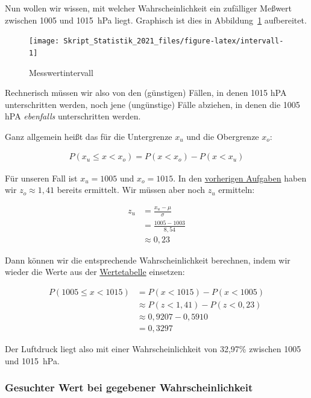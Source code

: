 \documentclass[
  11pt,
  ngerman,
  a4paper,
]{report}
\begin{document}
Nun wollen wir wissen, mit welcher Wahrscheinlichkeit ein zufälliger Meßwert zwischen 1005 und 1015~hPa liegt. Graphisch ist dies in Abbildung~\ref{fig:intervall} aufbereitet.

\begin{figure}[!h]

{\centering \texttt{[image: Skript\_Statistik\_2021\_files/figure-latex/intervall-1]} 

}

\caption{Messwertintervall}\label{fig:intervall}
\end{figure}

Rechnerisch müssen wir also von den (günstigen) Fällen, in denen 1015 hPA unterschritten werden, noch jene (ungünstige) Fälle abziehen, in denen die 1005 hPA \emph{ebenfalls} unterschritten werden.

Ganz allgemein heißt das für die Untergrenze \(x_u\) und die Obergrenze \(x_o\):

\[\begin{aligned}
    P(x_{u} \leq x < x_{o}) = P(x < x_{o}) - P(x < x_{u})
  \end{aligned}
  \label{eq:intervall}
\]

Für unseren Fall ist \(x_u=1005\) und \(x_o=1015\). In den \protect\hyperlink{unter}{vorherigen Aufgaben} haben wir \(z_o\approx1,41\) bereits ermittelt. Wir müssen aber noch \(z_u\) ermitteln:

\[\begin{aligned}
    z_u &= \frac{x_u-\mu}{\sigma} \\[4pt]
        &= \frac{1005-1003}{8{,}54}  \\[4pt]
        &\approx 0{,}23
\end{aligned}\]

Dann können wir die entsprechende Wahrscheinlichkeit berechnen, indem wir wieder die Werte aus der \protect\hyperlink{tabelle-z}{Wertetabelle} einsetzen:

\[
  \begin{aligned}
    P(1005 \leq x < 1015) &= P(x < 1015) - P(x < 1005) \\
    &\approx P(z < 1{,}41) - P(z < 0{,}23) \\
    &\approx 0{,}9207- 0{,}5910  \\
    &= 0{,}3297
  \end{aligned}
  \]

Der Luftdruck liegt also mit einer Wahrscheinlichkeit von 32,97\% zwischen 1005 und 1015~hPa.

\hypertarget{gesuchter-wert-bei-gegebener-wahrscheinlichkeit}{%
\subsubsection{Gesuchter Wert bei gegebener Wahrscheinlichkeit}\label{gesuchter-wert-bei-gegebener-wahrscheinlichkeit}}
\end{document}
